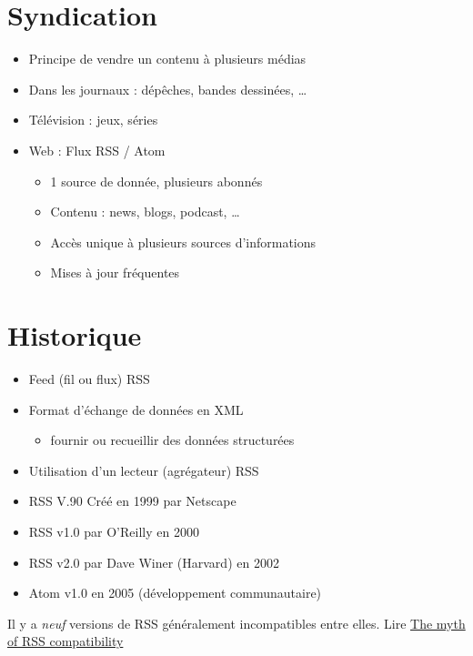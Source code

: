 \hypertarget{syndication}{%
\section{Syndication}\label{syndication}}

\begin{itemize}
\tightlist
\item
  Principe de vendre un contenu à plusieurs médias
\item
  Dans les journaux : dépêches, bandes dessinées, \ldots{}
\item
  Télévision : jeux, séries
\item
  Web : Flux RSS / Atom

  \begin{itemize}
  \tightlist
  \item
    1 source de donnée, plusieurs abonnés
  \item
    Contenu : news, blogs, podcast, \ldots{}
  \item
    Accès unique à plusieurs sources d'informations
  \item
    Mises à jour fréquentes
  \end{itemize}
\end{itemize}

\hypertarget{historique}{%
\section{Historique}\label{historique}}

\begin{itemize}
\tightlist
\item
  Feed (fil ou flux) RSS
\item
  Format d'échange de données en XML

  \begin{itemize}
  \tightlist
  \item
    fournir ou recueillir des données structurées
  \end{itemize}
\item
  Utilisation d'un lecteur (agrégateur) RSS
\item
  RSS V.90 Créé en 1999 par Netscape
\item
  RSS v1.0 par O'Reilly en 2000
\item
  RSS v2.0 par Dave Winer (Harvard) en 2002
\item
  Atom v1.0 en 2005 (développement communautaire)
\end{itemize}

Il y a \emph{neuf} versions de RSS généralement incompatibles entre
elles. Lire
\href{https://web.archive.org/web/20110726001954/http://diveintomark.org/archives/2004/02/04/incompatible-rss}{The
myth of RSS compatibility}


